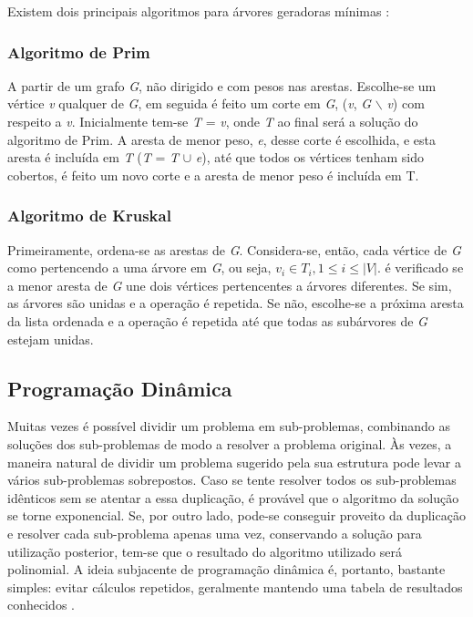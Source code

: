 Existem dois principais algoritmos para árvores geradoras mínimas \cite{Bondy:2007}:

\subsubsection{Algoritmo de Prim}

A partir de um grafo \textit{G}, não dirigido e com pesos nas arestas. Escolhe-se um vértice \textit{v} qualquer de \textit{G}, em seguida é feito um corte em \textit{G}, ({\textit{v}}, \textit{G} $\backslash$ {\textit{v}}) com respeito a \textit{v}. Inicialmente tem-se \textit{T} = {\textit{v}}, onde \textit{T} ao final será a solução do algoritmo de Prim. A aresta de menor peso, \textit{e}, desse corte é escolhida, e esta aresta é incluída em \textit{T} (\textit{T} = \textit{T} $\cup$ {\textit{e}}), até que todos os vértices tenham sido cobertos, é feito um novo corte e a aresta de menor peso é incluída em T.

\subsubsection{Algoritmo de Kruskal}

Primeiramente, ordena-se as arestas de \textit{G}. Considera-se, então, cada vértice de \textit{G} como pertencendo a uma árvore em \textit{G}, ou seja, $\textit{v}_i \in \textit{T}_i , 1 \leq i \leq |\textit{V}|$. é verificado se a menor aresta de \textit{G} une dois vértices pertencentes a árvores diferentes. Se sim, as árvores são unidas e a operação é repetida. Se não, escolhe-se a próxima aresta da lista ordenada e a operação é repetida até que todas as subárvores de \textit{G} estejam unidas.

\subsection{Programação Dinâmica}

Muitas vezes é possível dividir um problema em sub-problemas, combinando as soluções dos sub-problemas de modo a resolver a problema original. Às vezes, a maneira natural de dividir um problema sugerido pela sua estrutura pode levar a vários sub-problemas sobrepostos. Caso se tente resolver todos os sub-problemas idênticos sem se atentar a essa duplicação, é provável que o algoritmo da solução se torne exponencial. Se, por outro lado, pode-se conseguir proveito da duplicação e resolver cada sub-problema apenas uma vez, conservando a solução para utilização posterior, tem-se que o resultado do algoritmo utilizado será polinomial. A ideia subjacente de programação dinâmica é, portanto, bastante simples: evitar cálculos repetidos, geralmente mantendo uma tabela de resultados conhecidos \cite{Aho:1983}.

